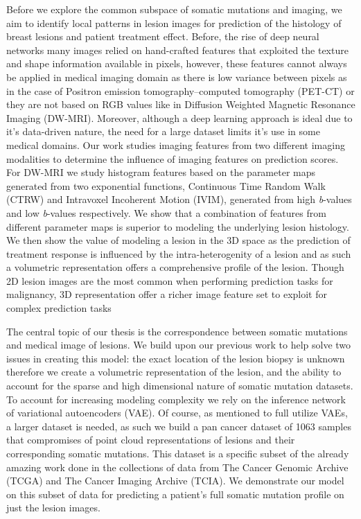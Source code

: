 Before we explore the common subspace of somatic mutations and imaging, we aim to identify local patterns in lesion images for prediction of the histology of breast lesions and patient treatment effect.  Before, the rise of deep neural networks many images relied on hand-crafted features that exploited the texture and shape information available in pixels, however, these features cannot always be applied in medical imaging domain as there is low variance between pixels as in the case of Positron emission tomography–computed tomography (PET-CT) or they are not based on RGB values like in Diffusion Weighted Magnetic Resonance Imaging (DW-MRI).  Moreover, although a deep learning approach is ideal due to it's data-driven nature, the need for a large dataset limits it's use in some medical domains.  Our work studies imaging features from two different imaging modalities to determine the influence of imaging features on prediction scores.  For DW-MRI we study histogram features based on the parameter maps generated from two exponential functions, Continuous Time Random Walk (CTRW) and Intravoxel Incoherent Motion (IVIM), generated from high \textit{b}-values and low \textit{b}-values respectively.  We show that a combination of features from different parameter maps is superior to modeling the underlying lesion histology.  We then show the value of modeling a lesion in the 3D space as the prediction of treatment response is influenced by the intra-heterogenity of a lesion and as such a volumetric representation offers a comprehensive profile of the lesion.  Though 2D lesion images are the most common when performing prediction tasks for malignancy, 3D representation offer a richer image feature set to exploit for complex prediction tasks

The central topic of our thesis is the correspondence between somatic mutations and medical image of lesions.  We build upon our previous work to help solve two issues in creating this model: the exact location of the lesion biopsy is unknown therefore we create a volumetric representation of the lesion, and the ability to account for the sparse and high dimensional nature of somatic mutation datasets.  To account for increasing modeling complexity we rely on the inference network of variational autoencoders (VAE).  Of course, as mentioned to full utilize VAEs, a larger dataset is needed, as such we build a pan cancer dataset of 1063 samples that compromises of point cloud representations of lesions and their corresponding somatic mutations.  This dataset is a specific subset of the already amazing work done in the collections of data from The Cancer Genomic Archive (TCGA) and The Cancer Imaging Archive (TCIA).  We demonstrate our model on this subset of data for predicting a patient's full somatic mutation profile on just the lesion images.    